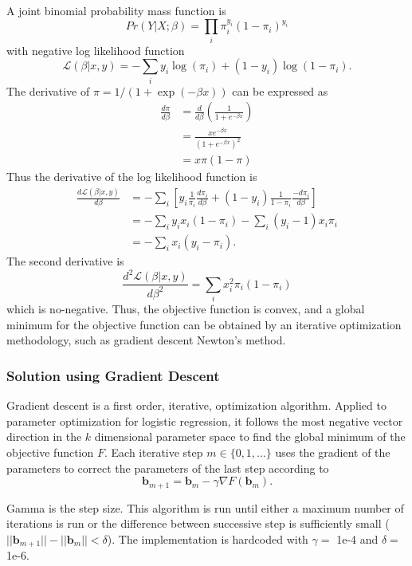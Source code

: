 \documentclass{article}
\begin{document}
A joint binomial probability mass function is 
$$Pr(Y|X;\beta) = \prod_i \pi_i^{y_i}\left(1-\pi_i\right)^{y_i}$$ with negative log likelihood function
$$\mathcal{L}\left(\beta|x, y\right) = -\sum_i y_i\log(\pi_i) + \left(1-y_i\right)\log\left(1-\pi_i\right).$$ 
The derivative of $\pi = 1/(1+\exp(-\beta x))$ can be expressed as 
\begin{align*}
\frac{d\pi}{d\beta} &= \frac{d}{d\beta}\left(\frac{1}{1+e^{-\beta x}}\right) \\
&=\frac{xe^{-\beta x}}{\left(1+e^{-\beta x}\right)^2}\\
&=x\pi(1-\pi)
\end{align*}
Thus the derivative of the log likelihood function is 
\begin{align*}
\frac{d\mathcal{L}\left(\beta|x, y\right)}{d\beta} &= -\sum_i \left[y_i\frac{1}{\pi_i}\frac{d\pi_i}{d\beta} + \left(1-y_i\right)\frac{1}{1-\pi_i}\frac{-d\pi_i}{d\beta}\right] \\
&= -\sum_i y_ix_i\left(1-\pi_i\right) - \sum_i\left(y_i-1\right)x_i\pi_i\\
&=-\sum_i x_i\left(y_i-\pi_i\right).
\end{align*} 
The second derivative is
$$\frac{d^2\mathcal{L}\left(\beta|x, y\right)}{d\beta^2} = \sum_i x_i^2\pi_i\left(1-\pi_i\right)$$ which is no-negative. Thus, the objective function is convex, and a global minimum for the objective function can be obtained by an iterative optimization methodology, such as gradient descent Newton's method. 

\subsubsection*{Solution using Gradient Descent}

Gradient descent is a first order, iterative, optimization algorithm. Applied to parameter optimization for logistic regression, it follows the most negative vector direction in the $k$ dimensional parameter space to find the global minimum of the objective function $F$. Each iterative step $m \in \{0, 1, ...\}$ uses the gradient of the parameters to correct the parameters of the last step according to 
\[\mathbf{b}_{m+1} = \mathbf{b}_m - \gamma\nabla F\left(\mathbf{b}_m\right).\]

Gamma is the step size. This algorithm is run until either a maximum number of iterations is run or the difference between successive step is sufficiently small ($||\mathbf{b}_{m+1}|| - ||\mathbf{b}_m|| < \delta$). The implementation is hardcoded with $\gamma =$ 1e-4 and $\delta =$ 1e-6. 
\end{document}
